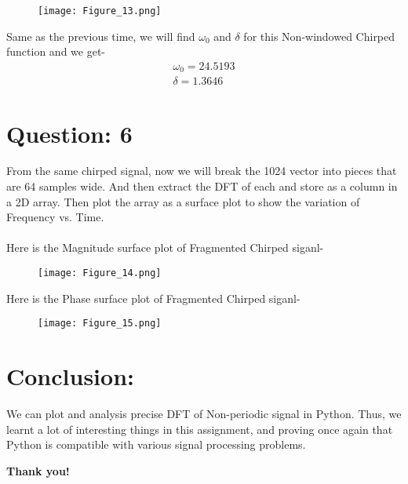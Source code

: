 \documentclass[12pt]{article}
\begin{document}
\begin{figure}[h!]
\centering
\texttt{[image: Figure\_13.png]}
\label{fig:exemplo}
\end{figure}

Same as the previous time, we will find $\omega_{0}$ and $\delta$ for this Non-windowed Chirped function and we get-
\begin{equation}
  \begin{aligned}
    \omega_{0} = 24.5193\\
    \delta = 1.3646
  \end{aligned}
\end{equation}

\newpage
\section*{Question: 6}

From the same chirped signal, now we will break the 1024 vector into pieces that are 64 samples wide. And then extract the DFT of each and store as a column in a 2D array. Then plot the array as a surface plot to show the variation of Frequency vs. Time.\\\\
Here is the Magnitude surface plot of Fragmented Chirped siganl-

\begin{figure}[h!]
\centering
\texttt{[image: Figure\_14.png]}
\label{fig:exemplo}
\end{figure}

\newpage
Here is the Phase surface plot of Fragmented Chirped siganl-
\begin{figure}[h!]
\centering
\texttt{[image: Figure\_15.png]}
\label{fig:exemplo}
\end{figure}

\section*{\textbf{Conclusion:}}
We can plot and analysis precise DFT of Non-periodic signal in Python. Thus, we learnt a lot of interesting things in this assignment, and proving once again that Python is compatible with various signal processing problems.

\begin{center} 
\textbf{Thank you!}
\end{center} 
\end{document}
